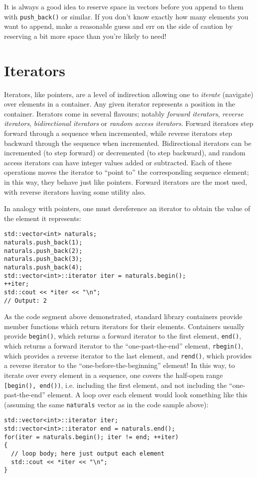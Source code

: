 \documentclass[a4paper]{scrartcl}
\begin{document}
It is always a good idea to reserve space in vectors before you append to them with \verb|push_back()| or similar. If you don't know exactly how many elements you want to append, make a reasonable guess and err on the side of caution by reserving a bit more space than you're likely to need!

\section{Iterators}\label{sec:iter}
Iterators, like pointers, are a level of indirection allowing one to \emph{iterate} (navigate) over elements in a container. Any given iterator represents a position in the container. Iterators come in several flavours; notably \emph{forward iterators}, \emph{reverse iterators}, \emph{bidirectional iterators} or \emph{random access iterators}. Forward iterators step forward through a sequence when incremented, while reverse iterators step backward through the sequence when incremented. Bidirectional iterators can be incremented (to step forward) or decremented (to step backward), and random access iterators can have integer values added or subtracted. Each of these operations moves the iterator to ``point to'' the corresponding sequence element; in this way, they behave just like pointers. Forward iterators are the most used, with reverse iterators having some utility also.

In analogy with pointers, one must dereference an iterator to obtain the value of the element it represents:
\begin{verbatim}
std::vector<int> naturals;
naturals.push_back(1);
naturals.push_back(2);
naturals.push_back(3);
naturals.push_back(4);
std::vector<int>::iterator iter = naturals.begin();
++iter;
std::cout << *iter << "\n";
// Output: 2
\end{verbatim}

As the code segment above demonstrated, standard library containers provide member functions which return iterators for their elements. Containers usually provide \verb|begin()|, which returns a forward iterator to the first element, \verb|end()|, which returns a forward iterator to the ``one-past-the-end'' element, \verb|rbegin()|, which provides a reverse iterator to the last element, and \verb|rend()|, which provides a reverse iterator to the ``one-before-the-beginning'' element! In this way, to iterate over every element in a sequence, one covers the half-open range \verb|[begin(), end())|, i.e. including the first element, and not including the ``one-past-the-end'' element. A loop over each element would look something like this (assuming the same \verb|naturals| vector as in the code sample above):
\begin{verbatim}
std::vector<int>::iterator iter;
std::vector<int>::iterator end = naturals.end();
for(iter = naturals.begin(); iter != end; ++iter)
{
  // loop body; here just output each element
  std::cout << *iter << "\n";
}
\end{verbatim}
\end{document}
